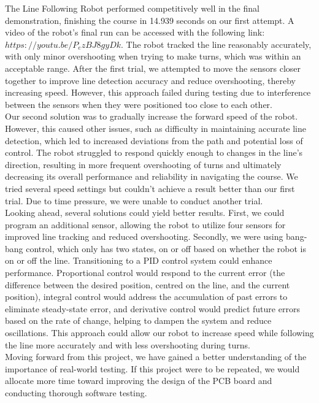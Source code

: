 The Line Following Robot performed competitively well in the final demonstration, finishing the course in 14.939 seconds on our first attempt. A video of the robot's final run can be accessed with the following link: \href{https://youtu.be/P_ezBJ8gyDk}{$https://youtu.be/P_ezBJ8gyDk$}. The robot tracked the line reasonably accurately, with only minor overshooting when trying to make turns, which was within an acceptable range. After the first trial, we attempted to move the sensors closer together to improve line detection accuracy and reduce overshooting, thereby increasing speed. However, this approach failed during testing due to interference between the sensors when they were positioned too close to each other. 
\\

Our second solution was to gradually increase the forward speed of the robot. However, this caused other issues, such as difficulty in maintaining accurate line detection, which led to increased deviations from the path and potential loss of control. The robot struggled to respond quickly enough to changes in the line’s direction, resulting in more frequent overshooting of turns and ultimately decreasing its overall performance and reliability in navigating the course. We tried several speed settings but couldn’t achieve a result better than our first trial. Due to time pressure, we were unable to conduct another trial. 
\\

Looking ahead, several solutions could yield better results. First, we could program an additional sensor, allowing the robot to utilize four sensors for improved line tracking and reduced overshooting. Secondly, we were using bang-bang control, which only has two states, on or off based on whether the robot is on or off the line. Transitioning to a PID control system could enhance performance. Proportional control would respond to the current error (the difference between the desired position, centred on the line, and the current position), integral control would address the accumulation of past errors to eliminate steady-state error, and derivative control would predict future errors based on the rate of change, helping to dampen the system and reduce oscillations. This approach could allow our robot to increase speed while following the line more accurately and with less overshooting during turns. 
\\

Moving forward from this project, we have gained a better understanding of the importance of real-world testing. If this project were to be repeated, we would allocate more time toward improving the design of the PCB board and conducting thorough software testing. 